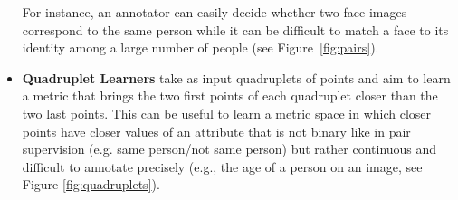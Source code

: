 \documentclass[twoside,11pt]{article}
\begin{document}
\begin{itemize}
For instance, an annotator can easily decide whether two face images correspond to the same person while it can be difficult to match a face to its identity among a large number of people (see Figure~\ref{fig:pairs}). 
\item \textbf{Quadruplet Learners} take as input quadruplets of points and aim to learn a metric that brings the two first points of each quadruplet closer than the two last points. This can be useful to learn a metric space in which closer points have closer values of an attribute that is not binary like in pair supervision (e.g. same person/not same person) but rather continuous and difficult to annotate precisely (e.g., the age of a person on an image, see Figure \ref{fig:quadruplets}).
\end{itemize}


\end{document}
